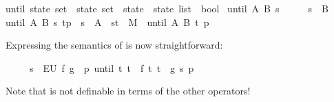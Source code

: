 \begin{isabellebody}
\begin{isamarkuptext}
\end{isamarkuptext}%
\isamarkuptrue%
\isamarkupfalse%
\isanewline
until{}{}\ {}state\ set\ {}\ state\ set\ {}\ state\ {}\ state\ list\ {}\ bool{}\ \isanewline
{}until\ A\ B\ s\ {}{}\ \ \ \ {}\ {}s\ {}\ B{}{}\ {}\isanewline
{}until\ A\ B\ s\ {}t{}p{}\ {}\ {}s\ {}\ A\ {}\ {}s{}t{}\ {}\ M\ {}\ until\ A\ B\ t\ p{}{}%
\begin{isamarkuptext}%
\noindent
Expressing the semantics of  is now straightforward:
\begin{isabelle}%
\ \ \ \ \ s\ {}\ EU\ f\ g\ {}\ {}{}p{}\ until\ {}t{}\ t\ {}\ f{}\ {}t{}\ t\ {}\ g{}\ s\ p{}%
\end{isabelle}
Note that  is not definable in terms of the other operators!


\end{isamarkuptext}
\end{isabellebody}
